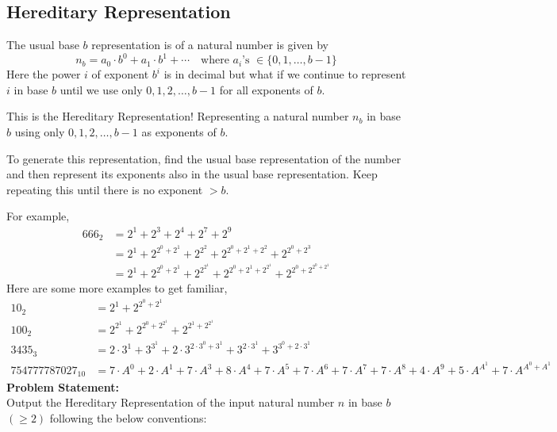 \documentclass[../../Problems]{subfiles}
\begin{document}
\recalctypearea
\subsection{Hereditary Representation}
The usual base $b$ representation is of a natural number is given by
\begin{equation}
 	n_b = a_0 \cdot b^0 + a_1 \cdot b^1 + \cdots \quad\text{where $a_i$'s $\in \{0,1,\ldots,b-1\}$}
\end{equation} Here the power $i$ of exponent $b^i$ is in decimal but what if we continue to represent $i$ in base $b$ until we use only $0, 1, 2, \ldots, b-1$ for all exponents of $b$.

This is the Hereditary Representation! Representing a natural number $n_b$ in base $b$ using only $0, 1, 2, \ldots, b-1$ as exponents of $b$.

To generate this representation, find the usual base representation of the number and then represent its exponents also in the usual base representation. Keep repeating this until there is no exponent $> b$.

For example, 
\begin{equation}
\begin{aligned}
666_2 &= 2^1 + 2^3 + 2^4 + 2^7 + 2^9\\
&= 2^1  + 2^{2^0+2^1} + 2^{2^2} + 2^{2^{0}+2^1+2^2} + 2^{2^{0}+2^3}\\
&= 2^{1} + 2^{2^{0} + 2^{1}} + 2^{2^{2^{1}}} + 2^{2^{0} + 2^{1} + 2^{2^{1}}} + 2^{2^{0} + 2^{2^{0} + 2^{1}}}
\end{aligned}
\end{equation}
Here are some more examples to get familiar,
\begin{align*}
10_2 &= 2^{1} + 2^{2^{0} + 2^{1}}\\
100_2 &= 2^{2^{1}} + 2^{2^{0} + 2^{2^{1}}} + 2^{2^{1} + 2^{2^{1}}}\\
3435_3 &= 2\cdot3^{1} + 3^{3^{1}} + 2\cdot3^{2\cdot3^{0} + 3^{1}} + 3^{2\cdot3^{1}} + 3^{3^{0} + 2\cdot3^{1}}\\
754777787027_{10} &= 7\cdot A^{0} + 2\cdot A^{1} + 7\cdot A^{3} + 8\cdot A^{4} + 7\cdot A^{5} + 7\cdot A^{6} + 7\cdot A^{7} + 7\cdot A^{8} + 4\cdot A^{9} + 5\cdot A^{A^{1}} + 7\cdot A^{A^{0} + A^{1}}
\end{align*}
\textbf{Problem Statement:}\\
Output the Hereditary Representation of the input natural number $n$ in base $b$ $(\geq2)$ following the below conventions:
\end{document}
